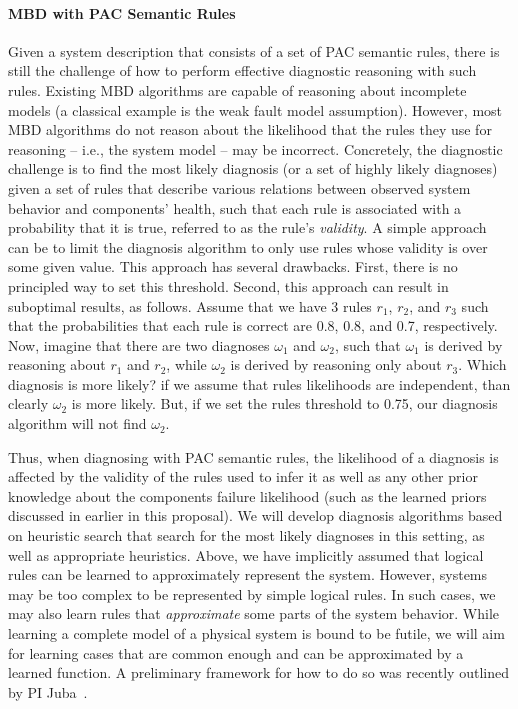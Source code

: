 \documentclass[12pt]{article}
\begin{document}
\paragraph{MBD with PAC Semantic Rules}
Given a system description that consists of a set of PAC semantic rules, there is still the challenge 
of how to perform effective diagnostic reasoning with such rules. 
Existing MBD algorithms are capable of reasoning about incomplete models (a classical example is the weak fault model assumption). However, most MBD algorithms do not reason about the likelihood that the rules they use for reasoning -- i.e., the system model -- may be incorrect. 
Concretely, the diagnostic challenge is to find the most likely diagnosis (or a set of highly likely diagnoses) given a set of rules that describe various relations between observed system behavior and components' health, such that each rule is associated with a probability that it is true, referred to as the rule's {\em validity}. 
A simple approach can be to limit the diagnosis algorithm to only use rules whose validity is over some given value. This approach has several drawbacks. First, there is no principled way to set this threshold. Second, this approach can result in suboptimal results, as follows. 
Assume that we have 3 rules $r_1$, $r_2$, and $r_3$ such that the probabilities that each rule is correct are 0.8, 0.8, and 0.7, respectively. 
Now, imagine that there are two diagnoses $\omega_1$ and $\omega_2$, such that $\omega_1$ is derived by reasoning about $r_1$ and $r_2$, while $\omega_2$ is derived by reasoning only about $r_3$. Which diagnosis is more likely? 
if we assume that rules likelihoods are independent, than clearly $\omega_2$ is more likely. But, if we set the rules threshold to 0.75, our diagnosis algorithm will not find $\omega_2$. 

Thus, when diagnosing with PAC semantic rules,  the likelihood of a diagnosis is affected by  the validity of the rules used to infer it as well as any other prior knowledge about the components failure likelihood (such as the learned priors discussed in earlier in this proposal). We will develop diagnosis algorithms based on heuristic search that search for the most likely diagnoses in this setting, as well as appropriate heuristics.
Above, we have implicitly assumed that logical rules can be learned to approximately represent the system. However, systems may be too complex to be represented by simple logical rules. In such cases, we may also learn rules that {\em approximate} some parts of the system behavior. While learning a complete model of a physical system is bound to be futile, we will aim for learning cases that are common enough and can be approximated by a learned function. A preliminary framework for how to do so was recently outlined by PI Juba~\cite{juba2016aaai,juba2016conditional}.
\end{document}
